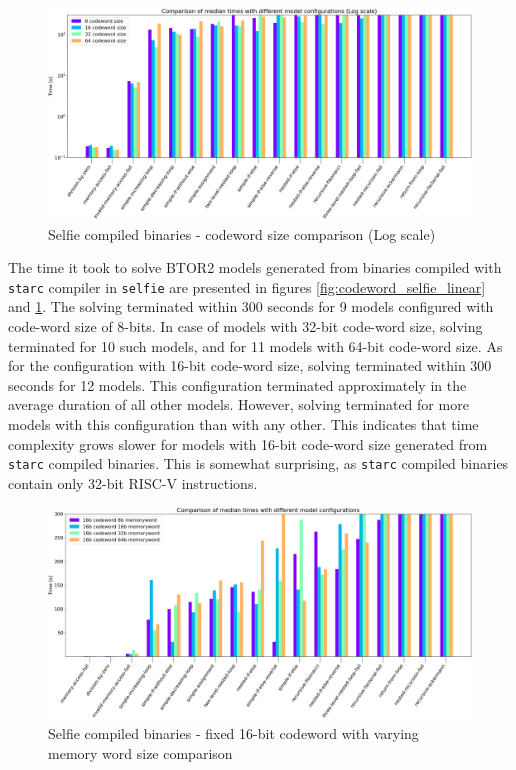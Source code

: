 \documentclass[12pt]{article}
\begin{document}
\begin{figure}[!h]
    \includegraphics[width=\linewidth]{assets/benches/codeword_selfie_log.png}
    \centering
    \caption{
        Selfie compiled binaries - codeword size comparison (Log scale)
    }
    \label{fig:codeword_selfie_log}
\end{figure}

The time it took to solve BTOR2 models generated from binaries compiled with
\texttt{starc} compiler in \texttt{selfie} are presented in figures
\ref{fig:codeword_selfie_linear} and \ref{fig:codeword_selfie_log}. The solving
terminated within 300 seconds for 9 models configured with code-word size of
8-bits. In case of models with 32-bit code-word size, solving terminated for 10
such models, and for 11 models with 64-bit code-word size. As for the
configuration with 16-bit code-word size, solving terminated within 300 seconds
for 12 models. This configuration terminated approximately in the average
duration of all other models. However, solving terminated for more models with
this configuration than with any other. This indicates that time complexity
grows slower for models with 16-bit code-word size generated from
\texttt{starc} compiled binaries. This is somewhat surprising, as
\texttt{starc} compiled binaries contain only 32-bit RISC-V instructions.

\begin{figure}[!h]
    \includegraphics[width=\linewidth]{assets/benches/16b_codeword_memword_selfie_linear.png}
    \centering
    \caption{
        Selfie compiled binaries - fixed 16-bit codeword with varying memory word size comparison
    }
    \label{fig:16b_codeword_memword_selfie_linear}
\end{figure}
\end{document}
